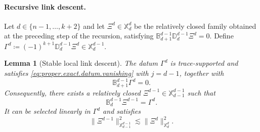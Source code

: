 \documentclass[a4paper,11pt]{article}
\newtheorem{lemma}[theorem]{Lemma}
\theoremstyle{definition}
\begin{document}
\paragraph{Recursive link descent.}
Let $d\in\{n-1,\ldots,k+2\}$ and let $\Xi^d\in\mathbb X_d^d$ be the relatively closed family obtained at the preceding step of the recursion, satisfying $\mathbb B_{d+1}^{d-1}\mathbb D_d^{d-1}\Xi^d=0$.
Define $\Gamma^d \coloneqq (-1)^{k+1} \mathbb D_d^{d-1}\Xi^d \in\mathbb X_d^{d-1}$.

\begin{lemma}[Stable local link descent]
\label{lem:local.link.descent}
The datum $\Gamma^d$ is trace-supported and satisfies \eqref{eq:proper.exact.datum.vanishing} with $j=d-1$, together with
\[
  \mathbb B_{d+1}^{d-1}\Gamma^d=0.
\]
Consequently, there exists a relatively closed $\Xi^{d-1}\in\mathbb X_{d-1}^{d-1}$ such that
\[
  \mathbb B_d^{d-1}\Xi^{d-1}=\Gamma^d.
\]
It can be selected linearly in $\Gamma^d$ and satisfies
\begin{equation}\label{eq:local.link.descent.stability}
  \|\Xi^{d-1}\|_{\mathbb X_{d-1}^{d-1}}^2
  \lesssim
  \|\Xi^d\|_{\mathbb X_d^d}^2.
\end{equation}
\end{lemma}
\end{document}
